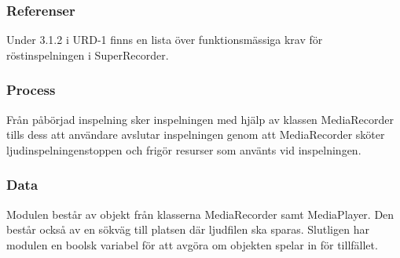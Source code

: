 \subsubsection{Referenser}
Under 3.1.2 i URD-1 finns en lista över funktionsmässiga krav för röstinspelningen i SuperRecorder.

\subsubsection{Process}
Från påbörjad inspelning sker inspelningen med hjälp av klassen MediaRecorder tills dess att användare avslutar inspelningen genom att MediaRecorder sköter ljudinspelningenstoppen och frigör resurser som använts vid inspelningen.

\subsubsection{Data}
Modulen består av objekt från klasserna MediaRecorder samt MediaPlayer. Den består också av en sökväg till platsen där ljudfilen ska sparas. Slutligen har modulen en boolsk variabel för att avgöra om objekten spelar in för tillfället.
